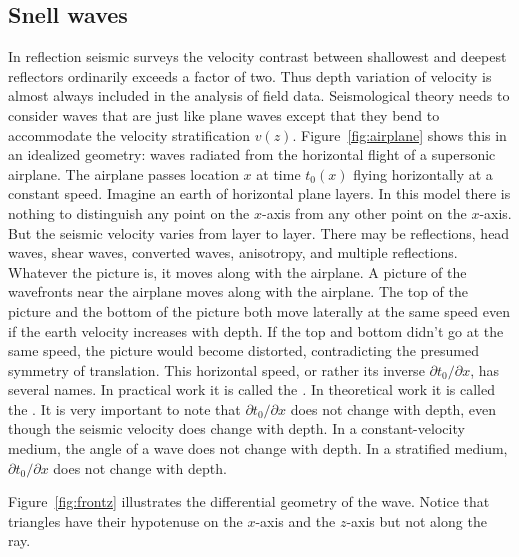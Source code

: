 \subsection{Snell waves}
\par
In reflection seismic surveys the velocity
contrast between shallowest and deepest
reflectors ordinarily exceeds a factor of two.
Thus depth variation of velocity is almost always included
in the analysis of field data.
Seismological theory needs to consider waves
that are just like plane waves except that they bend
to accommodate the velocity stratification  $v(z)$.
Figure~\ref{fig:airplane} shows this in an idealized geometry:
waves radiated from the horizontal flight of a supersonic airplane.
The airplane passes location $x$ at time $t_0(x)$
flying horizontally at a constant speed.
Imagine an earth of horizontal plane layers.
In this model there is nothing to distinguish any point
on the $x$-axis from any other point on the $x$-axis.
But the seismic velocity varies from layer to layer.
There may be reflections, head waves, shear waves, converted waves,
anisotropy, and multiple reflections.
Whatever the picture is, it moves along with the airplane.
A picture of the wavefronts near the airplane moves along with the airplane.
The top of the picture and the bottom of the picture both move laterally at
the same speed even if the earth velocity increases with depth.
If the top and bottom didn't go at the same speed,
the picture would become distorted,
contradicting the presumed symmetry of translation.
This horizontal speed, or rather its inverse  ${\partial t_0}/{\partial x}$,
has several names.
In practical work it is called the
{\em  {}.}
In theoretical work it is called the
{\em  {}}.
It is very important to note that  ${\partial t_0}/{\partial x}$
does not change with depth,
even though the seismic velocity does change with depth.
In a constant-velocity medium, the angle of a wave
does not change with depth.
In a stratified medium,
${\partial t_0}/{\partial x}$  does not change with depth.
\par
Figure~\ref{fig:frontz} illustrates the differential geometry of the wave.
Notice that triangles have their
hypotenuse on the $x$-axis and the $z$-axis
but not along the ray.
